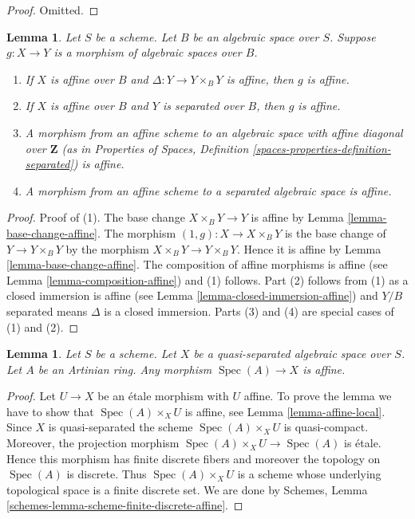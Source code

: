 \documentclass{stacks-project}
\theoremstyle{plain}
\newtheorem{lemma}[subsection]{Lemma}
\theoremstyle{definition}
\theoremstyle{remark}
\numberwithin{equation}{subsection}
\def\Spec{\mathop{\mathrm{Spec}}}
\begin{document}
\begin{proof}
Omitted.
\end{proof}

\begin{lemma}
\label{lemma-affine-permanence}
Let $S$ be a scheme. Let $B$ be an algebraic space over $S$.
Suppose $g : X \to Y$ is a morphism of algebraic spaces over $B$.
\begin{enumerate}
\item If $X$ is affine over $B$ and $\Delta : Y \to Y \times_B Y$ is affine,
then $g$ is affine.
\item If $X$ is affine over $B$ and $Y$ is separated over $B$,
then $g$ is affine.
\item A morphism from an affine scheme to an algebraic space with affine
diagonal over $\mathbf{Z}$ (as in Properties of Spaces, Definition
\ref{spaces-properties-definition-separated}) is affine.
\item A morphism from an affine scheme to a separated algebraic space
is affine.
\end{enumerate}
\end{lemma}

\begin{proof}
Proof of (1). The base change $X \times_B Y \to Y$ is affine by
Lemma \ref{lemma-base-change-affine}.
The morphism $(1, g) : X \to X \times_B Y$ is the base change of
$Y \to Y \times_B Y$ by the morphism $X \times_B Y \to Y \times_B Y$.
Hence it is affine by
Lemma \ref{lemma-base-change-affine}.
The composition of affine morphisms is affine
(see Lemma \ref{lemma-composition-affine}) and (1) follows.
Part (2) follows from (1) as a closed immersion is affine
(see Lemma \ref{lemma-closed-immersion-affine}) and $Y/B$ separated
means $\Delta$ is a closed immersion. Parts (3) and (4) are special
cases of (1) and (2).
\end{proof}

\begin{lemma}
\label{lemma-Artinian-affine}
Let $S$ be a scheme. Let $X$ be a quasi-separated algebraic space over $S$.
Let $A$ be an Artinian ring. Any morphism $\Spec(A) \to X$ is affine.
\end{lemma}

\begin{proof}
Let $U \to X$ be an \'etale morphism with $U$ affine. To prove the
lemma we have to show that $\Spec(A) \times_X U$ is affine, see
Lemma \ref{lemma-affine-local}. Since $X$ is quasi-separated the
scheme $\Spec(A) \times_X U$ is quasi-compact. Moreover, the
projection morphism $\Spec(A) \times_X U \to \Spec(A)$ is \'etale.
Hence this morphism has finite discrete fibers and moreover
the topology on $\Spec(A)$ is discrete. Thus $\Spec(A) \times_X U$
is a scheme whose underlying topological
space is a finite discrete set. We are done by
Schemes, Lemma \ref{schemes-lemma-scheme-finite-discrete-affine}.
\end{proof}
\end{document}
